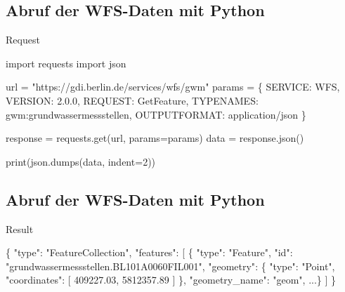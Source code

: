 \documentclass[
  letterpaper,
  DIV=11]{scrartcl}
\newenvironment{Shaded}{\begin{snugshade}}{\end{snugshade}}
\newcommand{\BuiltInTok}[1]{\textcolor[rgb]{0.00,0.23,0.31}{#1}}
\newcommand{\DecValTok}[1]{\textcolor[rgb]{0.68,0.00,0.00}{#1}}
\newcommand{\FloatTok}[1]{\textcolor[rgb]{0.68,0.00,0.00}{#1}}
\newcommand{\ImportTok}[1]{\textcolor[rgb]{0.00,0.46,0.62}{#1}}
\newcommand{\NormalTok}[1]{\textcolor[rgb]{0.00,0.23,0.31}{#1}}
\newcommand{\OperatorTok}[1]{\textcolor[rgb]{0.37,0.37,0.37}{#1}}
\newcommand{\StringTok}[1]{\textcolor[rgb]{0.13,0.47,0.30}{#1}}
\begin{document}
\subsection{Abruf der WFS-Daten mit
Python}\label{abruf-der-wfs-daten-mit-python}

Request

\begin{Shaded}
\begin{Highlighting}[]
\ImportTok{import}\NormalTok{ requests}
\ImportTok{import}\NormalTok{ json}

\NormalTok{url }\OperatorTok{=} \StringTok{"https://gdi.berlin.de/services/wfs/gwm"}
\NormalTok{params }\OperatorTok{=}\NormalTok{ \{}
    \StringTok{\textquotesingle{}SERVICE\textquotesingle{}}\NormalTok{: }\StringTok{\textquotesingle{}WFS\textquotesingle{}}\NormalTok{,}
    \StringTok{\textquotesingle{}VERSION\textquotesingle{}}\NormalTok{: }\StringTok{\textquotesingle{}2.0.0\textquotesingle{}}\NormalTok{,}
    \StringTok{\textquotesingle{}REQUEST\textquotesingle{}}\NormalTok{: }\StringTok{\textquotesingle{}GetFeature\textquotesingle{}}\NormalTok{,}
    \StringTok{\textquotesingle{}TYPENAMES\textquotesingle{}}\NormalTok{: }\StringTok{\textquotesingle{}gwm:grundwassermessstellen\textquotesingle{}}\NormalTok{,}
    \StringTok{\textquotesingle{}OUTPUTFORMAT\textquotesingle{}}\NormalTok{: }\StringTok{\textquotesingle{}application/json\textquotesingle{}}
\NormalTok{\}}

\NormalTok{response }\OperatorTok{=}\NormalTok{ requests.get(url, params}\OperatorTok{=}\NormalTok{params)}
\NormalTok{data }\OperatorTok{=}\NormalTok{ response.json()}

\BuiltInTok{print}\NormalTok{(json.dumps(data, indent}\OperatorTok{=}\DecValTok{2}\NormalTok{))}
\end{Highlighting}
\end{Shaded}

\subsection{Abruf der WFS-Daten mit
Python}\label{abruf-der-wfs-daten-mit-python-1}

Result

\begin{Shaded}
\begin{Highlighting}[]
\NormalTok{\{}
  \StringTok{"type"}\NormalTok{: }\StringTok{"FeatureCollection"}\NormalTok{,}
  \StringTok{"features"}\NormalTok{: [}
\NormalTok{    \{}
      \StringTok{"type"}\NormalTok{: }\StringTok{"Feature"}\NormalTok{,}
      \StringTok{"id"}\NormalTok{: }\StringTok{"grundwassermessstellen.BL101A0060FIL001"}\NormalTok{,}
      \StringTok{"geometry"}\NormalTok{: \{}
        \StringTok{"type"}\NormalTok{: }\StringTok{"Point"}\NormalTok{,}
        \StringTok{"coordinates"}\NormalTok{: [}
          \FloatTok{409227.03}\NormalTok{,}
          \FloatTok{5812357.89}
\NormalTok{        ]}
\NormalTok{      \},}
      \StringTok{"geometry\_name"}\NormalTok{: }\StringTok{"geom"}\NormalTok{,}
\NormalTok{      ...\}}
\NormalTok{  ]}
\NormalTok{\}}
\end{Highlighting}
\end{Shaded}
\end{document}
